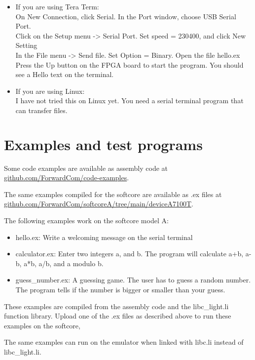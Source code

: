 \documentclass[11pt,a4paper,oneside,openright]{report}
\newcommand{\vv}{ \vspace{2mm} }   %
\begin{document}
\begin{itemize}
\item If you are using Tera Term: \\ 
On New Connection, click Serial. In the Port window, choose USB Serial Port. \\
Click on the Setup menu -> Serial Port. Set speed = 230400, and click New Setting\\
In the File menu -> Send file. Set Option = Binary. Open the file hello.ex \\
Press the Up button on the FPGA board to start the program. You should see a Hello text on the terminal.
\item If you are using Linux: \\ 
I have not tried this on Linux yet. You need a serial terminal program that can transfer files.
\end{itemize}


\chapter{Examples and test programs}
Some code examples are available as assembly code at \\
\href{https://github.com/ForwardCom/code-examples}{github.com/ForwardCom/code-examples}.
\vv

The same examples compiled for the softcore are available as .ex files at \\
\href{https://github.com/ForwardCom/softcoreA/tree/main/deviceA7100T}{github.com/ForwardCom/softcoreA/tree/main/deviceA7100T}.
\vv

The following examples work on the softcore model A:
\begin{itemize}
\item hello.ex: Write a welcoming message on the serial terminal
\item calculator.ex: Enter two integers a, and b. The program will calculate a+b, a-b, a*b, a/b, and a modulo b.
\item guess\_number.ex: A guessing game. The user has to guess a random number. The program tells if the number is bigger or smaller than your guess.
\end{itemize}

These examples are compiled from the assembly code and the libc\_light.li function library. Upload one of the .ex files as described above to run these examples on the softcore, 
\vv

The same examples can run on the emulator when linked with libc.li instead of libc\_light.li.
\end{document}
